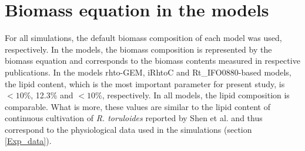 

\section{Biomass equation in the models}



For all simulations, the default biomass composition of each model was used, respectively. In the models, the biomass composition is represented by the biomass equation and corresponds to the biomass contents measured in respective publications. 
In the models rhto-GEM, iRhtoC and Rt\_IFO0880-based models, the lipid content, which is the most important parameter for present study, is $<10$\%, 12.3\% and $<10$\%, respectively. In all models, the lipid composition is comparable. What is more, these values are similar to the lipid content of continuous cultivation of \textit{R. toruloides} reported by Shen et al. \cite{Shen2013} and thus correspond to the physiological data used in the simulations (section \ref{Exp_data}).

